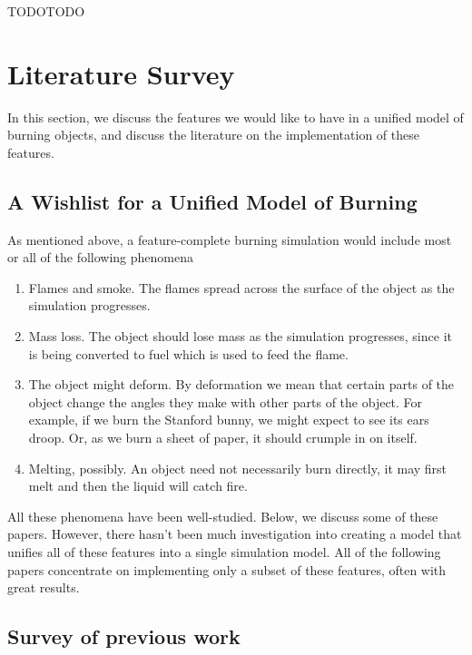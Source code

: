 \documentclass[a4paper]{report}
\begin{document}
TODOTODO


\chapter{Literature Survey}

In this section, we discuss the features we would like to have in a unified model of burning objects, and discuss the literature on the implementation of these features.

\section{A Wishlist for a Unified Model of Burning} %
\label{sec:a_wishlist_for_a_unified_model_of_burning}

As mentioned above, a feature-complete burning simulation would include most or all of the following phenomena

\begin{enumerate}
  \item Flames and smoke. The flames spread across the surface of the object as the simulation progresses.
  \item Mass loss. The object should lose mass as the simulation progresses, since it is being converted to fuel which is used to feed the flame.
  \item The object might deform. By deformation we mean that certain parts of the object change the angles they make with other parts of the object. For example, if we burn the Stanford bunny, we might expect to see its ears droop. Or, as we burn a sheet of paper, it should crumple in on itself.
  \item Melting, possibly. An object need not necessarily burn directly, it may first melt and then the liquid will catch fire.
\end{enumerate}

All these phenomena have been well-studied. Below, we discuss some of these papers. However, there hasn't been much investigation into creating a model that unifies all of these features into a single simulation model. All of the following papers concentrate on implementing only a subset of these features, often with great results.


\section{Survey of previous work} %
\label{sec:survey_of_previous_work}
\end{document}
